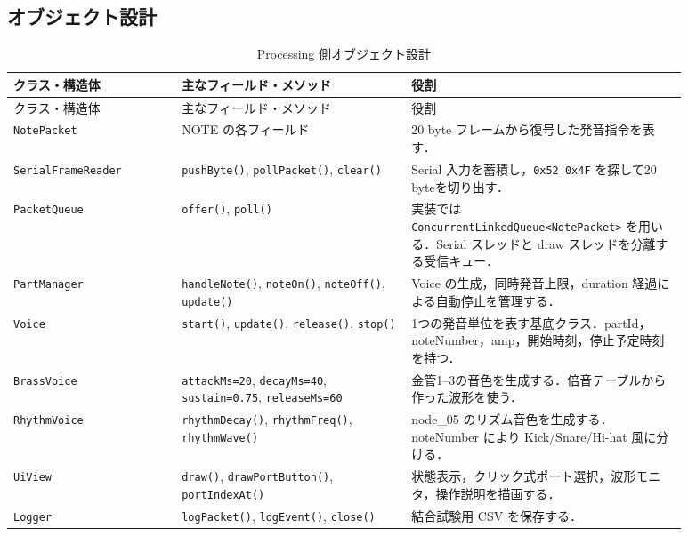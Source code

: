\documentclass[lualatex,book,paper=a4paper,jafontsize=11.5pt,jafontscale=1.05]{jlreq}
\begin{document}



\subsection{オブジェクト設計}
\begin{longtable}{p{0.22\linewidth}p{0.30\linewidth}p{0.36\linewidth}}
\caption{Processing 側オブジェクト設計}\label{tab:classes}\\
\toprule
クラス・構造体 & 主なフィールド・メソッド & 役割 \\
\midrule
\endfirsthead
\toprule
クラス・構造体 & 主なフィールド・メソッド & 役割 \\
\midrule
\endhead
\texttt{NotePacket} &
NOTE の各フィールド &
20 byte フレームから復号した発音指令を表す． \\
\texttt{SerialFrameReader} &
\texttt{pushByte()}, \texttt{pollPacket()}, \texttt{clear()} &
Serial 入力を蓄積し，\texttt{0x52 0x4F} を探して20 byteを切り出す． \\
\texttt{PacketQueue} &
\texttt{offer()}, \texttt{poll()} &
実装では \texttt{ConcurrentLinkedQueue<NotePacket>} を用いる．Serial スレッドと draw スレッドを分離する受信キュー． \\
\texttt{PartManager} &
\texttt{handleNote()}, \texttt{noteOn()}, \texttt{noteOff()}, \texttt{update()} &
Voice の生成，同時発音上限，duration 経過による自動停止を管理する． \\
\texttt{Voice} &
\texttt{start()}, \texttt{update()}, \texttt{release()}, \texttt{stop()} &
1つの発音単位を表す基底クラス．partId，noteNumber，amp，開始時刻，停止予定時刻を持つ． \\
\texttt{BrassVoice} &
\texttt{attackMs=20}, \texttt{decayMs=40}, \texttt{sustain=0.75}, \texttt{releaseMs=60} &
金管1--3の音色を生成する．倍音テーブルから作った波形を使う． \\
\texttt{RhythmVoice} &
\texttt{rhythmDecay()}, \texttt{rhythmFreq()}, \texttt{rhythmWave()} &
node\_05 のリズム音色を生成する．noteNumber により Kick/Snare/Hi-hat 風に分ける． \\
\texttt{UiView} &
\texttt{draw()}, \texttt{drawPortButton()}, \texttt{portIndexAt()} &
状態表示，クリック式ポート選択，波形モニタ，操作説明を描画する． \\
\texttt{Logger} &
\texttt{logPacket()}, \texttt{logEvent()}, \texttt{close()} &
結合試験用 CSV を保存する． \\
\bottomrule
\end{longtable}
\end{document}
